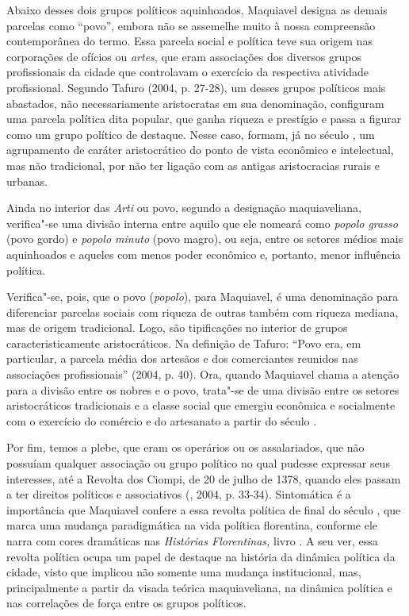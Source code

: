 Abaixo desses dois grupos políticos aquinhoados, Maquiavel designa as
demais parcelas como ``povo'', embora não se assemelhe muito à nossa
compreensão contemporânea do termo. Essa parcela social e política teve
sua origem nas corporações de ofícios ou \emph{artes}, que eram
associações dos diversos grupos profissionais da cidade que controlavam
o exercício da respectiva atividade profissional. Segundo Tafuro (2004,
p. 27-28), um desses grupos políticos mais abastados, não
necessariamente aristocratas em sua denominação, configuram uma parcela
política dita popular, que ganha riqueza e prestígio e passa a figurar
como um grupo político de destaque. Nesse caso, formam, já no século ,
um agrupamento de caráter aristocrático do ponto de vista econômico e
intelectual, mas não tradicional, por não ter ligação com as antigas
aristocracias rurais e urbanas.

Ainda no interior das \emph{Arti} ou povo, segundo a designação
maquiaveliana, verifica"-se uma divisão interna entre aquilo que ele
nomeará como \emph{popolo grasso} (povo gordo) e \emph{popolo minuto}
(povo magro), ou seja, entre os setores médios mais aquinhoados e
aqueles com menos poder econômico e, portanto, menor influência
política.

Verifica"-se, pois, que o povo (\emph{popolo}), para Maquiavel, é uma
denominação para diferenciar parcelas sociais com riqueza de outras
também com riqueza mediana, mas de origem tradicional. Logo, são
tipificações no interior de grupos caracteristicamente aristocráticos.
Na definição de Tafuro: ``Povo era, em particular, a parcela média dos
artesãos e dos comerciantes reunidos nas associações profissionais''
(2004, p. 40). Ora, quando Maquiavel chama a atenção para a divisão
entre os nobres e o povo, trata"-se de uma divisão entre os setores
aristocráticos tradicionais e a classe social que emergiu econômica e
socialmente com o exercício do comércio e do artesanato a partir do
século .

Por fim, temos a plebe, que eram os operários ou os assalariados, que
não possuíam qualquer associação ou grupo político no qual pudesse
expressar seus interesses, até a Revolta dos Ciompi, de 20 de julho de
1378, quando eles passam a ter direitos políticos e associativos
(, 2004, p. 33-34). Sintomática é a importância que Maquiavel
confere a essa revolta política de final do século , que marca uma
mudança paradigmática na vida política florentina, conforme ele narra
com cores dramáticas nas \emph{Histórias Florentinas,} livro . A seu
ver, essa revolta política ocupa um papel de destaque na história da
dinâmica política da cidade, visto que implicou não somente uma mudança
institucional, mas, principalmente a partir da visada teórica
maquiaveliana, na dinâmica política e nas correlações de força entre os
grupos políticos.

